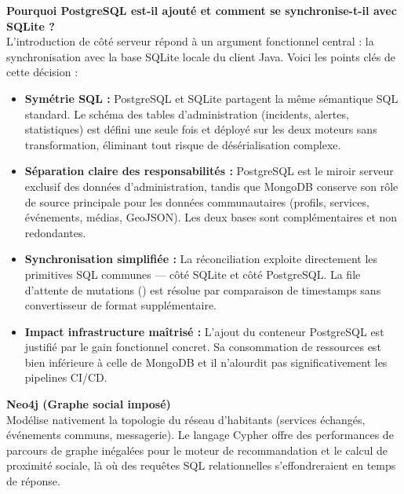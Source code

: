 \documentclass[12pt,a4paper]{article}
\begin{document}
\begin{warningbox}
    \textbf{Pourquoi PostgreSQL est-il ajouté et comment se synchronise-t-il avec SQLite ?} \\
    L'introduction de  côté serveur répond à un argument fonctionnel central : la
    synchronisation avec la base SQLite locale du client Java. Voici les points clés de cette décision :
    \begin{itemize}
        \item \textbf{Symétrie SQL :} PostgreSQL et SQLite partagent la même sémantique SQL standard.
              Le schéma des tables d'administration (incidents, alertes, statistiques) est défini une
              seule fois et déployé sur les deux moteurs sans transformation, éliminant tout risque
              de désérialisation complexe.
        \item \textbf{Séparation claire des responsabilités :} PostgreSQL est le miroir serveur
              exclusif des données d'administration, tandis que MongoDB conserve son rôle de source
              principale pour les données communautaires (profils, services, événements, médias,
              GeoJSON). Les deux bases sont complémentaires et non redondantes.
        \item \textbf{Synchronisation simplifiée :} La réconciliation exploite directement les
              primitives SQL communes —  côté SQLite et
               côté PostgreSQL. La file d'attente de mutations
              () est résolue par comparaison de timestamps sans convertisseur de
              format supplémentaire.
        \item \textbf{Impact infrastructure maîtrisé :} L'ajout du conteneur PostgreSQL est
              justifié par le gain fonctionnel concret. Sa consommation de ressources est bien
              inférieure à celle de MongoDB et il n'alourdit pas significativement les pipelines CI/CD.
    \end{itemize}
\end{warningbox}

\textbf{Neo4j (Graphe social imposé)} \\
Modélise nativement la topologie du réseau d'habitants (services échangés, événements communs, messagerie).
Le langage Cypher offre des performances de parcours de graphe inégalées pour le moteur de recommandation
et le calcul de proximité sociale, là où des requêtes SQL relationnelles s'effondreraient en temps de réponse.
\end{document}
